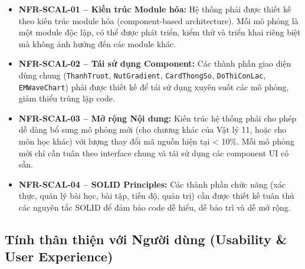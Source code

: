\begin{itemize}
    \item \textbf{NFR-SCAL-01 – Kiến trúc Module hóa:} Hệ thống phải được thiết kế theo kiến trúc module hóa (component-based architecture). Mỗi mô phỏng là một module độc lập, có thể được phát triển, kiểm thử và triển khai riêng biệt mà không ảnh hưởng đến các module khác.
    
    \item \textbf{NFR-SCAL-02 – Tái sử dụng Component:} Các thành phần giao diện dùng chung (\texttt{ThanhTruot}, \texttt{NutGradient}, \texttt{CardThongSo}, \texttt{DoThiConLac}, \texttt{EMWaveChart}) phải được thiết kế để tái sử dụng xuyên suốt các mô phỏng, giảm thiểu trùng lặp code.
    
    \item \textbf{NFR-SCAL-03 – Mở rộng Nội dung:} Kiến trúc hệ thống phải cho phép dễ dàng bổ sung mô phỏng mới (cho chương khác của Vật lý 11, hoặc cho môn học khác) với lượng thay đổi mã nguồn hiện tại < 10\%. Mỗi mô phỏng mới chỉ cần tuân theo interface chung và tái sử dụng các component UI có sẵn.
    
    \item \textbf{NFR-SCAL-04 – SOLID Principles:} Các thành phần chức năng (xác thực, quản lý bài học, bài tập, tiến độ, quản trị) cần được thiết kế tuân thủ các nguyên tắc SOLID để đảm bảo code dễ hiểu, dễ bảo trì và dễ mở rộng.
\end{itemize}

\subsection{Tính thân thiện với Người dùng (Usability \& User Experience)}

